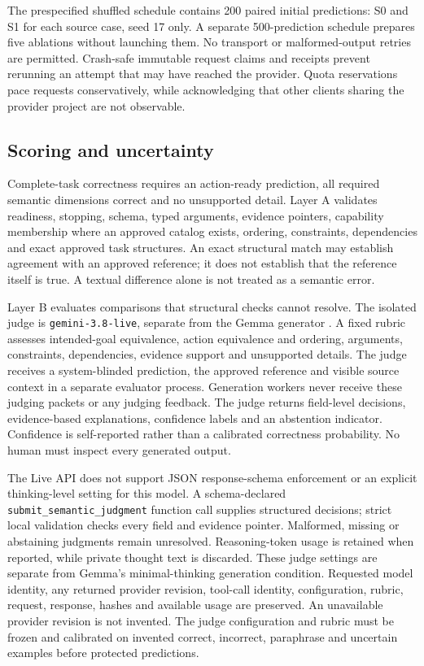 \documentclass[10pt,conference]{IEEEtran}
\begin{document}
The prespecified shuffled schedule contains 200 paired initial predictions: S0 and S1 for each source case, seed 17 only. A separate 500-prediction schedule prepares five ablations without launching them. No transport or malformed-output retries are permitted. Crash-safe immutable request claims and receipts prevent rerunning an attempt that may have reached the provider. Quota reservations pace requests conservatively, while acknowledging that other clients sharing the provider project are not observable.

\subsection{Scoring and uncertainty}
Complete-task correctness requires an action-ready prediction, all required semantic dimensions correct and no unsupported detail. Layer A validates readiness, stopping, schema, typed arguments, evidence pointers, capability membership where an approved catalog exists, ordering, constraints, dependencies and exact approved task structures. An exact structural match may establish agreement with an approved reference; it does not establish that the reference itself is true. A textual difference alone is not treated as a semantic error.

Layer B evaluates comparisons that structural checks cannot resolve. The isolated judge is \texttt{gemini-3.8-live}, separate from the Gemma generator \cite{gemini38live}. A fixed rubric assesses intended-goal equivalence, action equivalence and ordering, arguments, constraints, dependencies, evidence support and unsupported details. The judge receives a system-blinded prediction, the approved reference and visible source context in a separate evaluator process. Generation workers never receive these judging packets or any judging feedback. The judge returns field-level decisions, evidence-based explanations, confidence labels and an abstention indicator. Confidence is self-reported rather than a calibrated correctness probability. No human must inspect every generated output.

The Live API does not support JSON response-schema enforcement or an explicit thinking-level setting for this model. A schema-declared \texttt{submit\_semantic\_judgment} function call supplies structured decisions; strict local validation checks every field and evidence pointer. Malformed, missing or abstaining judgments remain unresolved. Reasoning-token usage is retained when reported, while private thought text is discarded. These judge settings are separate from Gemma's minimal-thinking generation condition. Requested model identity, any returned provider revision, tool-call identity, configuration, rubric, request, response, hashes and available usage are preserved. An unavailable provider revision is not invented. The judge configuration and rubric must be frozen and calibrated on invented correct, incorrect, paraphrase and uncertain examples before protected predictions.
\end{document}
